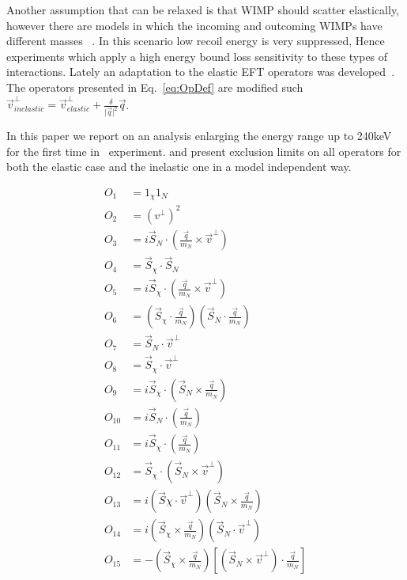 	    Another assumption that can be relaxed is that WIMP should scatter elastically, however there are models in which the incoming and outcoming WIMPs have different masses ~\cite{InelasticIntro}. In this scenario low recoil energy is very suppressed, Hence experiments which apply a high energy bound loss sensitivity to these types of interactions. Lately an adaptation to the elastic EFT operators was developed~\cite{InelasticMath}. The operators presented in Eq.~\ref{eq:OpDef} are modified such $\vec{v}^\perp_{inelastic} = \vec{v}^\perp_{elastic} +\frac{\delta}{\vert{\vec{q}}\vert^2}\vec{q}$.      
	    
	    In this paper we report on an analysis enlarging the energy range up to 240keV for the first time in \Xehund\ experiment. and present exclusion limits on all operators for both the elastic case and the inelastic one in a model independent way.     

\begin{equation} \label{eq:OpDef}
\begin{split}
O_1 &= 1_{\chi} 1_N  \\
O_2 &= (v^{\perp})^2 \\
O_3 &= i\vec{S}_N\cdot (\frac{\vec{q}}{m_N}\times\vec{v}^\perp) \\
O_4 &= \vec{S}_{\chi}\cdot \vec{S}_N \\
O_5 &= i\vec{S}_{\chi}\cdot (\frac{\vec{q}}{m_N}\times\vec{v}^\perp) \\O_6 &= (\vec{S}_{\chi} \cdot \frac{\vec{q}}{m_N})(\vec{S}_N \cdot \frac{\vec{q}}{m_N}) \\
O_7 &= \vec{S}_N \cdot \vec{v}^\perp \\
O_8 &= \vec{S}_{\chi} \cdot \vec{v}^\perp \\
O_9 &= i\vec{S}_{\chi} \cdot(\vec{S}_N \times \frac{\vec{q}}{m_N}) \\
O_{10} &= i\vec{S}_N \cdot (\frac{\vec{q}}{m_N}) \\
O_{11} &= i\vec{S}_{\chi} \cdot (\frac{\vec{q}}{m_N}) \\
O_{12} &= \vec{S}_\chi \cdot (\vec{S}_N \times \vec{v}^\perp) \\
O_{13} &= i(\vec{S}\chi \cdot \vec{v}^\perp)(\vec{S}_N \times \frac{\vec{q}}{m_N})\\
O_{14} &= i(\vec{S}_\chi \times \frac{\vec{q}}{m_N})(\vec{S}_N \cdot \vec{v}^\perp) \\
O_{15} &= -(\vec{S}_\chi \times \frac{\vec{q}}{m_N})[(\vec{S}_N \times \vec{v}^\perp)\cdot \frac{\vec{q}}{m_N}]
\end{split}
\end{equation}
	        	       
